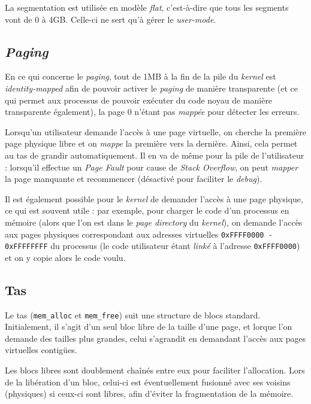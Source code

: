 \documentclass[a4paper, 10pt, french]{article}
\newcommand{\code}[1]{\texttt{#1}}
\newcommand{\foreign}[1]{\emph{#1}}
\begin{document}
La segmentation est utilisée en modèle \foreign{flat}, c'est-à-dire que tous les 
segments vont de 0 à 4GB. Celle-ci ne sert qu'à gérer le \foreign{user-mode}.


\subsection{\foreign{Paging}}

En ce qui concerne le \foreign{paging}, tout de 1MB à la fin de la pile du 
\foreign{kernel} est \foreign{identity-mapped} afin de pouvoir activer le 
\foreign{paging} de manière transparente (et ce qui permet aux processus de 
pouvoir exécuter du code noyau de manière transparente également), la page 0 
n'étant pas \foreign{mappée} pour détecter les erreurs.

Lorsqu'un utilisateur demande l'accès à une page virtuelle, on cherche la 
première page physique libre et on \foreign{mappe} la première vers la 
dernière. Ainsi, cela permet au tas de grandir automatiquement. Il en va de 
même pour la pile de l'utilisateur : lorsqu'il effectue un \foreign{Page 
Fault} pour cause de \foreign{Stack Overflow}, on peut \foreign{mapper} la page 
manquante et recommencer (désactivé pour faciliter le \foreign{debug}).

Il est également possible pour le \foreign{kernel} de demander l'accès à une 
page physique, ce qui est souvent utile : par exemple, pour charger le code 
d'un processus en mémoire (alors que l'on est dans le \foreign{page directory} 
du \foreign{kernel}), on demande l'accès aux pages physiques correspondant aux 
adresses virtuelles \code{0xFFFF0000 - 0xFFFFFFFF} du processus (le code 
utilisateur étant \foreign{linké} à l'adresse \code{0xFFFF0000}) et on y copie 
alors le code voulu.

\subsection{Tas}

Le tas (\code{mem\string_alloc} et \code{mem\string_free}) suit une structure 
de blocs standard. Initialement, il s'agit d'un seul bloc libre de la taille 
d'une page, et lorque l'on demande des tailles plus grandes, celui s'agrandit 
en demandant l'accès aux pages virtuelles contigües.

Les blocs libres sont doublement chaînés entre eux pour faciliter l'allocation. 
Lors de la libération d'un bloc, celui-ci est éventuellement fusionné avec ses 
voisins (physiques) si ceux-ci sont libres, afin d'éviter la fragmentation de 
la mémoire.
\end{document}
